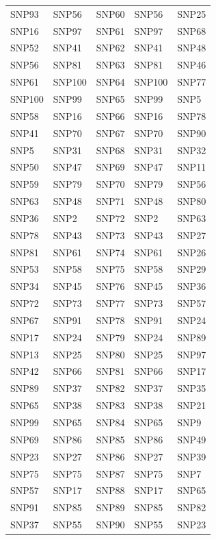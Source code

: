 \begin{table}[ht]
\begin{tabular}{lllll}
  SNP93 & SNP56 & SNP60 & SNP56 & SNP25 \\ 
  SNP16 & SNP97 & SNP61 & SNP97 & SNP68 \\ 
  SNP52 & SNP41 & SNP62 & SNP41 & SNP48 \\ 
  SNP56 & SNP81 & SNP63 & SNP81 & SNP46 \\ 
  SNP61 & SNP100 & SNP64 & SNP100 & SNP77 \\ 
  SNP100 & SNP99 & SNP65 & SNP99 & SNP5 \\ 
  SNP58 & SNP16 & SNP66 & SNP16 & SNP78 \\ 
  SNP41 & SNP70 & SNP67 & SNP70 & SNP90 \\ 
  SNP5 & SNP31 & SNP68 & SNP31 & SNP32 \\ 
  SNP50 & SNP47 & SNP69 & SNP47 & SNP11 \\ 
  SNP59 & SNP79 & SNP70 & SNP79 & SNP56 \\ 
  SNP63 & SNP48 & SNP71 & SNP48 & SNP80 \\ 
  SNP36 & SNP2 & SNP72 & SNP2 & SNP63 \\ 
  SNP78 & SNP43 & SNP73 & SNP43 & SNP27 \\ 
  SNP81 & SNP61 & SNP74 & SNP61 & SNP26 \\ 
  SNP53 & SNP58 & SNP75 & SNP58 & SNP29 \\ 
  SNP34 & SNP45 & SNP76 & SNP45 & SNP36 \\ 
  SNP72 & SNP73 & SNP77 & SNP73 & SNP57 \\ 
  SNP67 & SNP91 & SNP78 & SNP91 & SNP24 \\ 
  SNP17 & SNP24 & SNP79 & SNP24 & SNP89 \\ 
  SNP13 & SNP25 & SNP80 & SNP25 & SNP97 \\ 
  SNP42 & SNP66 & SNP81 & SNP66 & SNP17 \\ 
  SNP89 & SNP37 & SNP82 & SNP37 & SNP35 \\ 
  SNP65 & SNP38 & SNP83 & SNP38 & SNP21 \\ 
  SNP99 & SNP65 & SNP84 & SNP65 & SNP9 \\ 
  SNP69 & SNP86 & SNP85 & SNP86 & SNP49 \\ 
  SNP23 & SNP27 & SNP86 & SNP27 & SNP39 \\ 
  SNP75 & SNP75 & SNP87 & SNP75 & SNP7 \\ 
  SNP57 & SNP17 & SNP88 & SNP17 & SNP65 \\ 
  SNP91 & SNP85 & SNP89 & SNP85 & SNP82 \\ 
  SNP37 & SNP55 & SNP90 & SNP55 & SNP23 \\ 

\end{tabular}
\end{table}

